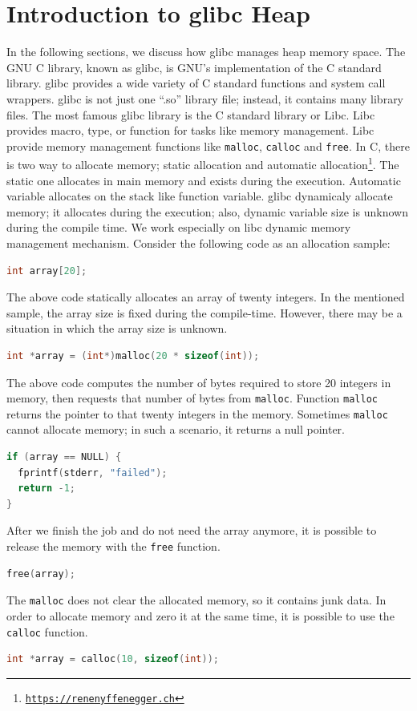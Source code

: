 \documentclass{masterthesis}
\newcommand*\libc{glibc}
\newcommand*\mallocc{\lstinline{malloc}\xspace}
\newcommand*\callocc{\lstinline{calloc}\xspace}
\begin{document}
\chapter{Introduction to \libc{} Heap}

In the following sections, we discuss how \libc{} manages heap memory space.
The GNU C library, known as \libc{}, is GNU's implementation of the C standard library. \libc{} provides a wide variety of C standard functions and system call wrappers. \libc{} is not just one ``.so'' library file; instead, it contains many library files. The most famous \libc{} library is the C standard library or Libc. Libc provides macro, type, or function for tasks like memory management.
Libc provide memory management functions like \mallocc, \callocc{} and \lstinline{free}. In C, there is two way to allocate memory; static allocation and automatic allocation\footnote{\href{https://renenyffenegger.ch/notes/development/languages/C-C-plus-plus/C/libc/alloc/index}{\texttt{https://renenyffenegger.ch}}}. The static one allocates in main memory and exists during the execution. Automatic variable allocates on the stack like function variable. \libc{} dynamicaly allocate memory; it allocates during the execution; also, dynamic variable size is unknown during the compile time. We work especially on libc dynamic memory management mechanism. Consider the following code as an allocation sample:
\begin{lstlisting}[language=c,frame=tlrb]
int array[20];
\end{lstlisting}

The above code statically allocates an array of twenty integers. In the mentioned sample, the array size is fixed during the compile-time. However, there may be a situation in which the array size is unknown.
\begin{lstlisting}[language=c,frame=tlrb]
int *array = (int*)malloc(20 * sizeof(int));
\end{lstlisting}
The above code computes the number of bytes required to store 20 integers in memory, then requests that number of bytes from \mallocc{}. Function \mallocc{} returns the pointer to that twenty integers in the memory. Sometimes \mallocc{} cannot allocate memory; in such a scenario, it returns a null pointer.
\begin{lstlisting}[language=c,frame=tlrb]
if (array == NULL) {
  fprintf(stderr, "failed");
  return -1;
}
\end{lstlisting}
After we finish the job and do not need the array anymore, it is possible to release the memory with the \lstinline{free} function.
\begin{lstlisting}[language=c,frame=tlrb]
free(array);
\end{lstlisting}
The \mallocc{} does not clear the allocated memory, so it contains junk data. In order to allocate memory and zero it at the same time, it is possible to use the \callocc{} function.
\begin{lstlisting}[language=c,frame=tlrb]
int *array = calloc(10, sizeof(int));
\end{lstlisting}
\end{document}
